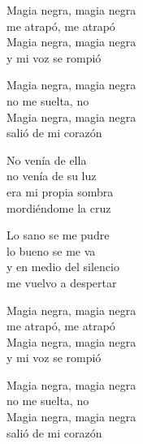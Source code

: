 \begin{lyrics}
Magia negra, magia negra\\
me atrapó, me atrapó\\
Magia negra, magia negra\\
y mi voz se rompió

Magia negra, magia negra\\
no me suelta, no\\
Magia negra, magia negra\\
salió de mi corazón

No venía de ella\\
no venía de su luz\\
era mi propia sombra\\
mordiéndome la cruz

Lo sano se me pudre\\
lo bueno se me va\\
y en medio del silencio\\
me vuelvo a despertar

Magia negra, magia negra\\
me atrapó, me atrapó\\
Magia negra, magia negra\\
y mi voz se rompió

Magia negra, magia negra\\
no me suelta, no\\
Magia negra, magia negra\\
salió de mi corazón

\end{lyrics}

